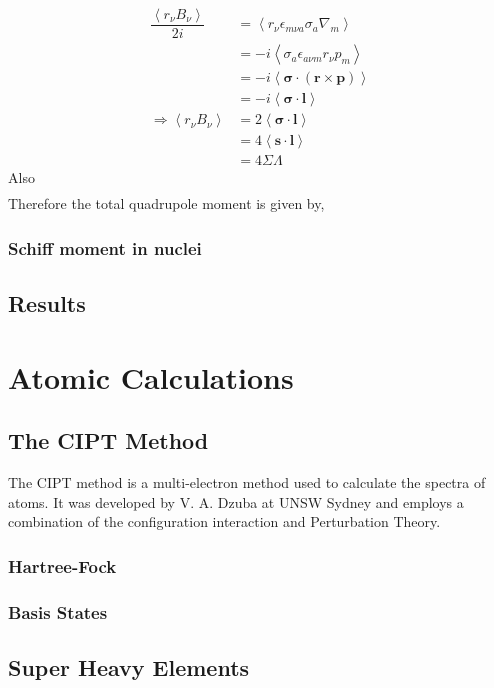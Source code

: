 \documentclass[10pt,a4paper, twoside]{report}
\begin{document}
\begin{align*}
\dfrac{\left<r_{\nu}B_{\nu}\right>}{2i} &= \left<r_{\nu}\epsilon_{m\nu a}\sigma_a \nabla_m\right> \\
&= -i\left<\sigma_a\epsilon_{a\nu m}r_{\nu} p_{m} \right> \\
&= -i\left<\boldsymbol{\sigma}\cdot\left(\textbf{r} \times \textbf{p}\right)\right> \\
&= -i\left<\boldsymbol{\sigma}\cdot\textbf{l}\right> \\ 
\Rightarrow \left<r_{\nu}B_{\nu}\right> &= 2\left<\boldsymbol{\sigma}\cdot\textbf{l}\right> \\
&= 4\left<\textbf{s}\cdot\textbf{l}\right> \\
&= 4\Sigma\Lambda
\end{align*}
Also
\begin{align*}
\end{align*}
Therefore the total quadrupole moment is given by,
\section{Schiff moment in nuclei}
\chapter{Results}
\part{Atomic Calculations}
\chapter{The CIPT Method}
The CIPT method is a multi-electron method used to calculate the spectra of atoms. It was developed by V. A. Dzuba at UNSW Sydney and employs a combination of the configuration interaction and Perturbation Theory.
\section{Hartree-Fock}
\section{Basis States}
\section{}
\chapter{Super Heavy Elements}


\end{document}
